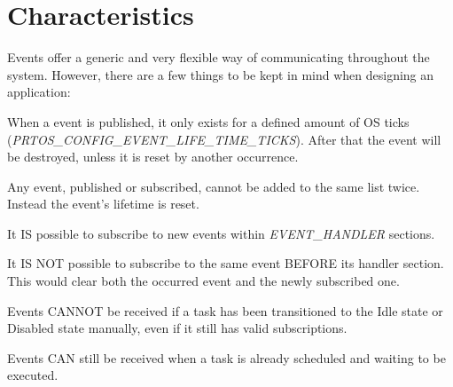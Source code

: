 \section{Characteristics}
Events offer a generic and very flexible way of communicating throughout the system. However, there are a few things to be kept in mind when designing an application:
\begin{pditemize}
	\item When a event is published, it only exists for a defined amount of OS ticks\\ (\textit{PRTOS\_CONFIG\_EVENT\_LIFE\_TIME\_TICKS}). After that the event will be destroyed, unless it is reset by another occurrence. 
	\item Any event, published or subscribed, cannot be added to the same list twice. Instead the event's lifetime is reset. 
	\item It IS possible to subscribe to new events within \textit{EVENT\_HANDLER} sections.
	\item It IS NOT possible to subscribe to the same event BEFORE its handler section. This would clear both the occurred event and the newly subscribed one.
	\item Events CANNOT be received if a task has been transitioned to the Idle state or Disabled state manually, even if it still has valid subscriptions.
	\item Events CAN still be received when a task is already scheduled and waiting to be executed.
\end{pditemize}



\FloatBarrier
